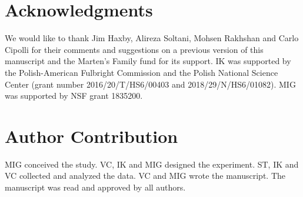 \documentclass[10pt,letterpaper]{article}
\begin{document}

\section*{Acknowledgments}
We would like to thank Jim Haxby, Alireza Soltani, Mohsen Rakhshan and Carlo Cipolli for their comments and suggestions on a previous version of this manuscript and the Marten’s Family fund for its support. IK was supported by the Polish-American Fulbright Commission and the Polish National Science Center (grant number 2016/20/T/HS6/00403 and 2018/29/N/HS6/01082). MIG was supported by NSF grant 1835200.

\section*{Author Contribution}
MIG conceived the study. VC, IK and MIG designed the experiment. ST, IK and VC collected and analyzed the data. VC and MIG wrote the manuscript.  The manuscript was read and approved by all authors. 

\nolinenumbers




\end{document}
